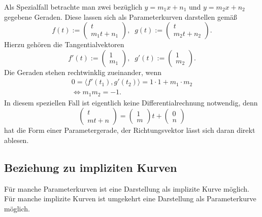Als Spezialfall betrachte man zwei bezüglich $y=m_1 x+n_1$ und
$y=m_2 x+n_2$ gegebene Geraden. Diese lassen sich als Parameterkurven
darstellen gemäß
\begin{equation}
f(t) := \begin{pmatrix}t\\ m_1 t+n_1\end{pmatrix},\;\;
g(t) := \begin{pmatrix}t\\ m_2 t+n_2\end{pmatrix}.
\end{equation}
Hierzu gehören die Tangentialvektoren
\begin{equation}
f'(t) := \begin{pmatrix}1\\ m_1\end{pmatrix},\;\;
g'(t) := \begin{pmatrix}1\\ m_2\end{pmatrix}.
\end{equation}
Die Geraden stehen rechtwinklig zueinander, wenn%
\begin{gather*}
0 = \langle f'(t_1),g'(t_2)\rangle = 1\cdot 1+m_1\cdot m_2\\
\iff m_1 m_2 = -1.
\end{gather*}
In diesem speziellen Fall ist eigentlich keine Differentialrechnung
notwendig, denn
\begin{equation}
\begin{pmatrix}t\\ m t+n\end{pmatrix}
= \begin{pmatrix}1\\ m\end{pmatrix}t+\begin{pmatrix}0\\ n\end{pmatrix}
\end{equation}
hat die Form einer Parametergerade, der Richtungsvektor lässt sich
daran direkt ablesen.


\subsection{Beziehung zu impliziten Kurven}

Für manche Parameterkurven ist eine Darstellung als implizite
Kurve möglich. Für manche implizite Kurven ist umgekehrt eine
Darstellung als Parameterkurve möglich.

